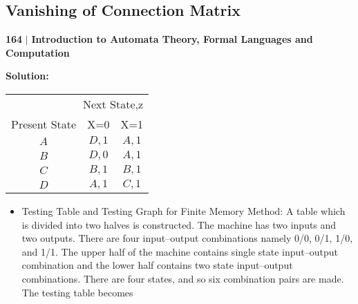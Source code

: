 \documentclass[9pt]{beamer}
\begin{document}
\begin{frame}
\section*{Vanishing of Connection Matrix}
 \begin{flushleft}
    \textbf{164}\hspace*{0.1cm} \textbf{$|$} \hspace*{0.1cm} {\tiny \textbf{Introduction to Automata Theory, Formal Languages and Computation}}
  \end{flushleft}
\vspace*{0.4cm}

\textbf{Solution:}\\

\begin{center}
\begin{tabular}{ccc}
\hline

\hline

\hline

\hline
  \multicolumn{3}{r}{{Next State,z}}\\
 \cline{2-3}
{Present State} & {X=0} & {X=1}\\
\hline
$A$ & $D, 1$ & $A, 1$ \\
$B$ & $D, 0$ & $A, 1$ \\
$C$ & $B, 1$ & $B, 1$ \\
$D$ & $A, 1$ & $C, 1$ \\
\hline

\hline

\hline

\hline
\end{tabular}
\end{center}

\vspace*{0.2cm}
\small{
\begin{itemize}
  \item Testing Table and Testing Graph for Finite Memory Method: A table which is divided into two
halves is constructed. The machine has two inputs and two outputs. There are four input–output
combinations namely 0/0, 0/1, 1/0, and 1/1. The upper half of the machine contains single state
input–output combination and the lower half contains two state input–output combinations. There
are four states, and so six combination pairs are made. The testing table becomes\\
\end{itemize}
}
\end{frame}
\end{document}
